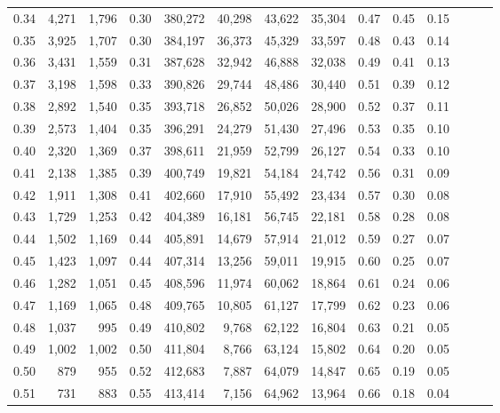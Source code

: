 \begin{tabular}{rrrrrrrrrrrrrr}
0.34 &   4,271 &  1,796 &  0.30 &  380,272 &   40,298 &  43,622 &  35,304 &  0.47 &  0.45 &      0.15 \\
0.35 &   3,925 &  1,707 &  0.30 &  384,197 &   36,373 &  45,329 &  33,597 &  0.48 &  0.43 &      0.14 \\
0.36 &   3,431 &  1,559 &  0.31 &  387,628 &   32,942 &  46,888 &  32,038 &  0.49 &  0.41 &      0.13 \\
0.37 &   3,198 &  1,598 &  0.33 &  390,826 &   29,744 &  48,486 &  30,440 &  0.51 &  0.39 &      0.12 \\
0.38 &   2,892 &  1,540 &  0.35 &  393,718 &   26,852 &  50,026 &  28,900 &  0.52 &  0.37 &      0.11 \\
0.39 &   2,573 &  1,404 &  0.35 &  396,291 &   24,279 &  51,430 &  27,496 &  0.53 &  0.35 &      0.10 \\
0.40 &   2,320 &  1,369 &  0.37 &  398,611 &   21,959 &  52,799 &  26,127 &  0.54 &  0.33 &      0.10 \\
0.41 &   2,138 &  1,385 &  0.39 &  400,749 &   19,821 &  54,184 &  24,742 &  0.56 &  0.31 &      0.09 \\
0.42 &   1,911 &  1,308 &  0.41 &  402,660 &   17,910 &  55,492 &  23,434 &  0.57 &  0.30 &      0.08 \\
0.43 &   1,729 &  1,253 &  0.42 &  404,389 &   16,181 &  56,745 &  22,181 &  0.58 &  0.28 &      0.08 \\
0.44 &   1,502 &  1,169 &  0.44 &  405,891 &   14,679 &  57,914 &  21,012 &  0.59 &  0.27 &      0.07 \\
0.45 &   1,423 &  1,097 &  0.44 &  407,314 &   13,256 &  59,011 &  19,915 &  0.60 &  0.25 &      0.07 \\
0.46 &   1,282 &  1,051 &  0.45 &  408,596 &   11,974 &  60,062 &  18,864 &  0.61 &  0.24 &      0.06 \\
0.47 &   1,169 &  1,065 &  0.48 &  409,765 &   10,805 &  61,127 &  17,799 &  0.62 &  0.23 &      0.06 \\
0.48 &   1,037 &    995 &  0.49 &  410,802 &    9,768 &  62,122 &  16,804 &  0.63 &  0.21 &      0.05 \\
0.49 &   1,002 &  1,002 &  0.50 &  411,804 &    8,766 &  63,124 &  15,802 &  0.64 &  0.20 &      0.05 \\
0.50 &     879 &    955 &  0.52 &  412,683 &    7,887 &  64,079 &  14,847 &  0.65 &  0.19 &      0.05 \\
0.51 &     731 &    883 &  0.55 &  413,414 &    7,156 &  64,962 &  13,964 &  0.66 &  0.18 &      0.04 \\

\end{tabular}
